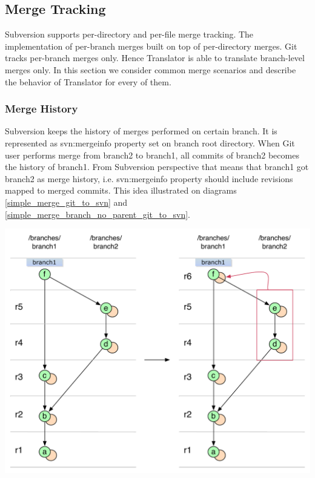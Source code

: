 \renewcommand{\figurename}{Diagram}
\subsection{Merge Tracking}

Subversion supports per-directory and per-file merge tracking. The implementation of per-branch merges built on top of per-directory merges. Git tracks per-branch merges only. Hence Translator is able to translate branch-level merges only. In this section we consider common merge scenarios and describe the behavior of Translator for every of them.

\subsubsection{Merge History}

Subversion keeps the history of merges performed on certain branch. It is represented as svn:mergeinfo property set on branch root directory. When Git user performs merge from branch2 to branch1, all commits of branch2 becomes the history of branch1. From Subversion perspective that means that branch1 got branch2 as merge history, i.e. svn:mergeinfo property should include revisions mapped to merged commits. This idea illustrated on diagrams \ref{simple_merge_git_to_svn} and \ref{simple_merge_branch_no_parent_git_to_svn}.

\begin{center}
\includegraphics[width=\textwidth]{img/diagrams/simple_merge_git_to_svn.pdf}%
\label{simple_merge_git_to_svn}%
\end{center}

